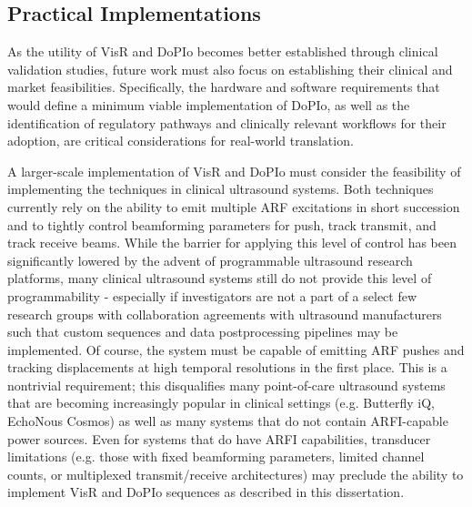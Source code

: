 \subsection{Practical Implementations}

As the utility of VisR and DoPIo becomes better established through clinical validation studies, future work must also focus on establishing their clinical and market feasibilities. Specifically, the hardware and software requirements that would define a minimum viable implementation of DoPIo, as well as the identification of regulatory pathways and clinically relevant workflows for their adoption, are critical considerations for real-world translation.

A larger-scale implementation of VisR and DoPIo must consider the feasibility of implementing the techniques in clinical ultrasound systems. Both techniques currently rely on the ability to emit multiple ARF excitations in short succession and to tightly control beamforming parameters for push, track transmit, and track receive beams. While the barrier for applying this level of control has been significantly lowered by the advent of programmable ultrasound research platforms, many clinical ultrasound systems still do not provide this level of programmability - especially if investigators are not a part of a select few research groups with collaboration agreements with ultrasound manufacturers such that custom sequences and data postprocessing pipelines may be implemented. Of course, the system must be capable of emitting ARF pushes and tracking displacements at high temporal resolutions in the first place. This is a nontrivial requirement; this disqualifies many point-of-care ultrasound systems that are becoming increasingly popular in clinical settings (e.g. Butterfly iQ, EchoNous Cosmos) as well as many systems that do not contain ARFI-capable power sources. Even for systems that do have ARFI capabilities, transducer limitations (e.g. those with fixed beamforming parameters, limited channel counts, or multiplexed transmit/receive architectures) may preclude the ability to implement VisR and DoPIo sequences as described in this dissertation. 

